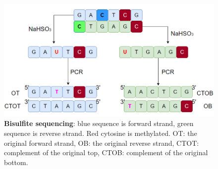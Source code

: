 \documentclass{PHlab-thesis}
\begin{document}
\begin{figure}[h]
  \centering
  \includegraphics[scale=0.8]{figures/BS_seq.PNG}
  \caption{\textbf{Bisulfite sequencing}: blue sequence is forward strand, green sequence is reverse strand. Red cytosine is methylated. OT: the original forward strand, OB: the original reverse strand, CTOT: complement  of the original top, CTOB: complement of the original bottom. }
  \label{fig:BS_seq}
\end{figure}

\vfill
\vspace{30mm}
\end{document}
